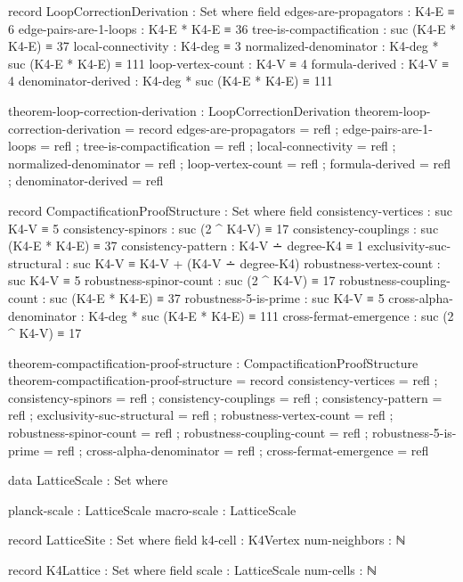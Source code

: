 \documentclass[11pt,a4paper]{book}
\begin{document}
\begin{code}
record LoopCorrectionDerivation : Set where
  field
    edges-are-propagators : K4-E ≡ 6
    edge-pairs-are-1-loops : K4-E * K4-E ≡ 36
    tree-is-compactification : suc (K4-E * K4-E) ≡ 37
    local-connectivity : K4-deg ≡ 3
    normalized-denominator : K4-deg * suc (K4-E * K4-E) ≡ 111
    loop-vertex-count : K4-V ≡ 4
    formula-derived : K4-V ≡ 4
    denominator-derived : K4-deg * suc (K4-E * K4-E) ≡ 111

theorem-loop-correction-derivation : LoopCorrectionDerivation
theorem-loop-correction-derivation = record
  { edges-are-propagators = refl
  ; edge-pairs-are-1-loops = refl
  ; tree-is-compactification = refl
  ; local-connectivity = refl
  ; normalized-denominator = refl
  ; loop-vertex-count = refl
  ; formula-derived = refl
  ; denominator-derived = refl
  }
\end{code}

\begin{code}
record CompactificationProofStructure : Set where
  field
    consistency-vertices : suc K4-V ≡ 5
    consistency-spinors : suc (2 ^ K4-V) ≡ 17
    consistency-couplings : suc (K4-E * K4-E) ≡ 37
    consistency-pattern : K4-V ∸ degree-K4 ≡ 1
    exclusivity-suc-structural : suc K4-V ≡ K4-V + (K4-V ∸ degree-K4)
    robustness-vertex-count : suc K4-V ≡ 5
    robustness-spinor-count : suc (2 ^ K4-V) ≡ 17
    robustness-coupling-count : suc (K4-E * K4-E) ≡ 37
    robustness-5-is-prime : suc K4-V ≡ 5
    cross-alpha-denominator : K4-deg * suc (K4-E * K4-E) ≡ 111
    cross-fermat-emergence : suc (2 ^ K4-V) ≡ 17

theorem-compactification-proof-structure : CompactificationProofStructure
theorem-compactification-proof-structure = record
  { consistency-vertices = refl
  ; consistency-spinors = refl
  ; consistency-couplings = refl
  ; consistency-pattern = refl
  ; exclusivity-suc-structural = refl
  ; robustness-vertex-count = refl
  ; robustness-spinor-count = refl
  ; robustness-coupling-count = refl
  ; robustness-5-is-prime = refl
  ; cross-alpha-denominator = refl
  ; cross-fermat-emergence = refl
  }
\end{code}

\begin{code}
data LatticeScale : Set where

  planck-scale : LatticeScale
  macro-scale  : LatticeScale

record LatticeSite : Set where
  field
    k4-cell : K4Vertex
    num-neighbors : ℕ

record K4Lattice : Set where
  field
    scale : LatticeScale
    num-cells : ℕ

\end{code}
\end{document}
